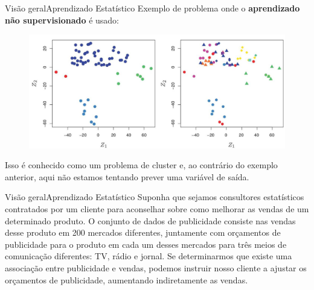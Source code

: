 \documentclass[t]{beamer}
\begin{document}
\begin{ftst}{Visão geral}{{Aprendizado Estatístico}}
\justifying
Exemplo de problema onde o \textbf{aprendizado não supervisionado} é usado:
 
\vone
\begin{figure}
    \centering
    \includegraphics[scale=0.8]{Figuras/slide03_03.jpg}
\end{figure}

Isso é conhecido como um problema de cluster e, ao contrário do exemplo anterior, aqui não estamos tentando prever uma variável de saída.
\end{ftst}



\begin{ftst}{Visão geral}{{Aprendizado Estatístico}}
\justifying
Suponha que sejamos consultores estatísticos contratados por um cliente para aconselhar sobre como melhorar as vendas de um determinado produto.
\vone
O conjunto de dados de publicidade consiste nas vendas desse produto em 200 mercados diferentes, juntamente com orçamentos de publicidade para o produto em cada um desses mercados para três meios de comunicação diferentes: TV, rádio e jornal.
\vone
Se determinarmos que existe uma associação entre publicidade e vendas, podemos instruir nosso cliente a ajustar os orçamentos de publicidade, aumentando indiretamente as vendas.

\end{ftst}

\end{document}
